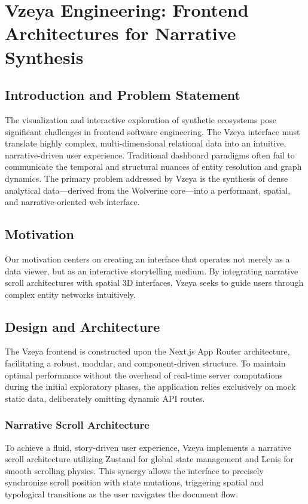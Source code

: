\chapter{Vzeya Engineering: Frontend Architectures for Narrative Synthesis}
\label{ch:vzeya}

\section{Introduction and Problem Statement}
The visualization and interactive exploration of synthetic ecosystems pose significant challenges in frontend software engineering. The Vzeya interface must translate highly complex, multi-dimensional relational data into an intuitive, narrative-driven user experience. Traditional dashboard paradigms often fail to communicate the temporal and structural nuances of entity resolution and graph dynamics. The primary problem addressed by Vzeya is the synthesis of dense analytical data---derived from the Wolverine core---into a performant, spatial, and narrative-oriented web interface.

\section{Motivation}
Our motivation centers on creating an interface that operates not merely as a data viewer, but as an interactive storytelling medium. By integrating narrative scroll architectures with spatial 3D interfaces, Vzeya seeks to guide users through complex entity networks intuitively.

\section{Design and Architecture}
The Vzeya frontend is constructed upon the Next.js App Router architecture, facilitating a robust, modular, and component-driven structure. To maintain optimal performance without the overhead of real-time server computations during the initial exploratory phases, the application relies exclusively on mock static data, deliberately omitting dynamic API routes. 

\subsection{Narrative Scroll Architecture}
To achieve a fluid, story-driven user experience, Vzeya implements a narrative scroll architecture utilizing Zustand for global state management and Lenis for smooth scrolling physics. This synergy allows the interface to precisely synchronize scroll position with state mutations, triggering spatial and typological transitions as the user navigates the document flow. 

